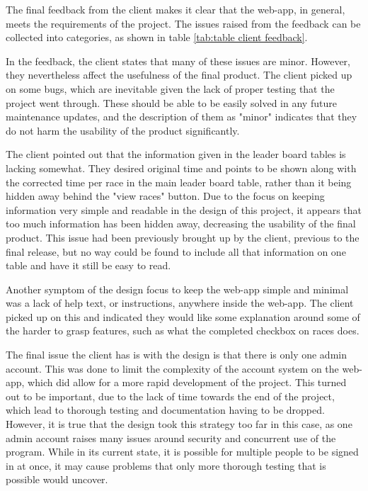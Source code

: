 \documentclass{l4proj}
\begin{document}
The final feedback from the client makes it clear that the web-app, in general, meets the requirements of the project. The issues raised from the feedback can be collected into categories, as shown in table \ref{tab:table client feedback}. 

In the feedback, the client states that many of these issues are minor. However, they nevertheless affect the usefulness of the final product. The client picked up on some bugs, which are inevitable given the lack of proper testing that the project went through. These should be able to be easily solved in any future maintenance updates, and the description of them as "minor" indicates that they do not harm the usability of the product significantly.

The client pointed out that the information given in the leader board tables is lacking somewhat. They desired original time and points to be shown along with the corrected time per race in the main leader board table, rather than it being hidden away behind the "view races" button. Due to the focus on keeping information very simple and readable in the design of this project, it appears that too much information has been hidden away, decreasing the usability of the final product. This issue had been previously brought up by the client, previous to the final release, but no way could be found to include all that information on one table and have it still be easy to read. 

Another symptom of the design focus to keep the web-app simple and minimal was a lack of help text, or instructions, anywhere inside the web-app. The client picked up on this and indicated they would like some explanation around some of the harder to grasp features, such as what the completed checkbox on races does. 

The final issue the client has is with the design is that there is only one admin account. This was done to limit the complexity of the account system on the web-app, which did allow for a more rapid development of the project. This turned out to be important, due to the lack of time towards the end of the project, which lead to thorough testing and documentation having to be dropped. However, it is true that the design took this strategy too far in this case, as one admin account raises many issues around security and concurrent use of the program. While in its current state, it is possible for multiple people to be signed in at once, it may cause problems that only more thorough testing that is possible would uncover.
\end{document}
